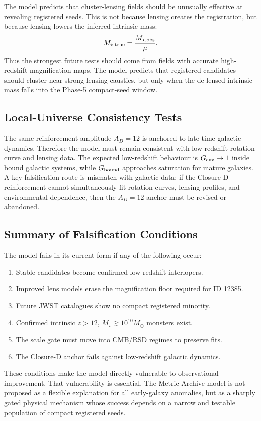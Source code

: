 \documentclass[11pt,a4paper]{article}
\newcommand{\Msun}{M_\odot}
\begin{document}
The model predicts that cluster-lensing fields should be unusually effective at revealing registered seeds. This is not because lensing creates the registration, but because lensing lowers the inferred intrinsic mass:
\begin{equation}
M_{\star,\rm true}=\frac{M_{\star,\rm obs}}{\mu}.
\end{equation}
Thus the strongest future tests should come from fields with accurate high-redshift magnification maps. The model predicts that registered candidates should cluster near strong-lensing caustics, but only when the de-lensed intrinsic mass falls into the Phase-5 compact-seed window.

\subsection{Local-Universe Consistency Tests}

The same reinforcement amplitude $A_D=12$ is anchored to late-time galactic dynamics. Therefore the model must remain consistent with low-redshift rotation-curve and lensing data. The expected low-redshift behaviour is $G_{\rm env}\rightarrow1$ inside bound galactic systems, while $G_{\rm bound}$ approaches saturation for mature galaxies. A key falsification route is mismatch with galactic data: if the Closure-D reinforcement cannot simultaneously fit rotation curves, lensing profiles, and environmental dependence, then the $A_D=12$ anchor must be revised or abandoned.

\subsection{Summary of Falsification Conditions}

The model fails in its current form if any of the following occur:
\begin{enumerate}
\item Stable candidates become confirmed low-redshift interlopers.
\item Improved lens models erase the magnification floor required for ID 12385.
\item Future JWST catalogues show no compact registered minority.
\item Confirmed intrinsic $z>12$, $M_\star\gtrsim10^{10}\Msun$ monsters exist.
\item The scale gate must move into CMB/RSD regimes to preserve fits.
\item The Closure-D anchor fails against low-redshift galactic dynamics.
\end{enumerate}
These conditions make the model directly vulnerable to observational improvement. That vulnerability is essential. The Metric Archive model is not proposed as a flexible explanation for all early-galaxy anomalies, but as a sharply gated physical mechanism whose success depends on a narrow and testable population of compact registered seeds.
\end{document}
